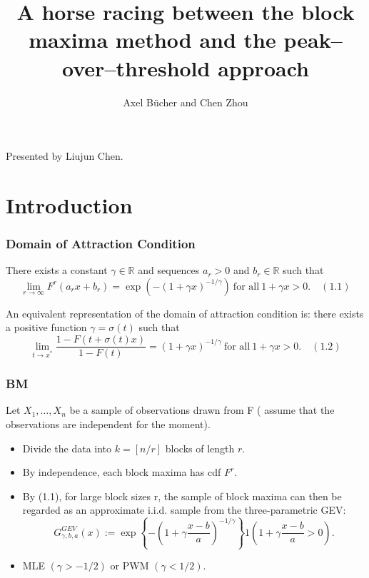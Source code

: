 \documentclass{beamer}
\author{Axel B\"ucher and Chen Zhou}
\title{A horse racing between the block maxima
method and the peak–over–threshold approach}
\newcommand{\suit}[1]{\left(#1\right)}
\newcommand{\set}[1]{\left\{#1\right\}}
\begin{document}
\begin{frame}
\titlepage
\begin{center}
    Presented by Liujun Chen.
\end{center}
\end{frame}


\section{Introduction}
\begin{frame}
    \frametitle{Domain of Attraction Condition}
There exists a constant $\gamma\in \mathbb{R}$ and sequences $a_r>0$ and $b_r\in \mathbb{R}$ such that 
$$
\lim_{r\to \infty} F^r(a_rx +b_r)=\exp\suit{-(1+\gamma x)^{-1/\gamma}}\ \text{for all} \ 1+\gamma x>0. \quad (1.1)
$$

An equivalent representation of the domain of attraction condition is: there exists a positive function $\gamma=\sigma(t)$ such that 
$$
\lim_{t\to x^*}\frac{1-F(t+\sigma(t)x)}{1-F(t)}=(1+\gamma x)^{-1/\gamma} \ \text{for all} \ 1+\gamma x>0.\quad (1.2)
$$
\end{frame}


\begin{frame}
    \frametitle{BM}
Let $X_1,\dots,X_n$ be a sample of observations drawn
from F ( assume that the observations are independent {\color{blue} for the moment}). 

\begin{itemize}
    \item Divide the data into $k=[n/r]$ blocks of length $r$.
    \item By independence, each block maxima has cdf $F^r$.
    \item By (1.1), for large block sizes
    r, the sample of block maxima can then be regarded as an approximate i.i.d. sample from the three-parametric GEV:
    $$
        G_{\gamma,b,a}^{GEV}(x):=\exp\set{-(1+\gamma\frac{x-b}{a})^{-1/\gamma}}1\suit{1+\gamma\frac{x-b}{a}>0}.
    $$
    \item MLE $(\gamma>-1/2)$ or PWM $(\gamma<1/2)$.
\end{itemize}
    

\end{frame}
\end{document}
